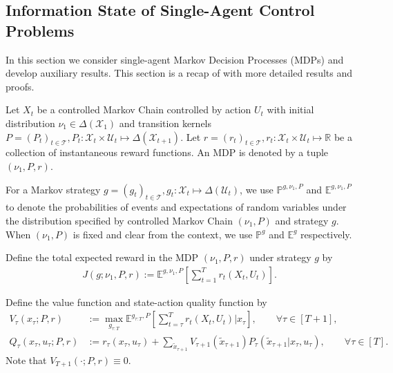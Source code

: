 \documentclass[pdflatex,sn-basic]{sn-jnl}
\newcommand{\E}{\mathbb{E}}
\renewcommand{\Pr}{\mathbb{P}}
\newcommand{\Qfunc}{Q}
\theoremstyle{thmstyleone}%
\theoremstyle{thmstyletwo}%
\theoremstyle{thmstylethree}%
\begin{document}
	
\appendix
\begin{appendices}

\section{Information State of Single-Agent Control Problems}\label{app:aux:infostate}
In this section we consider single-agent Markov Decision Processes (MDPs) and develop auxiliary results. This section is a recap of \cite{mahajan2016decentralized} with more detailed results and proofs. %

Let $X_t$ be a controlled Markov Chain controlled by action $U_t$ with initial distribution $\nu_1\in\Delta(\mathcal{X}_1)$ and transition kernels $P=(P_t)_{t\in\mathcal{T}}, P_t\colon\mathcal{X}_t\times \mathcal{U}_t\mapsto \Delta(\mathcal{X}_{t+1})$. Let $r=(r_t)_{t\in\mathcal{T}}, r_t\colon\mathcal{X}_t\times \mathcal{U}_t\mapsto \mathbb{R}$ be a collection of instantaneous reward functions. An MDP is denoted by a tuple $(\nu_1, P, r)$. 

For a Markov strategy $g=(g_t)_{t\in\mathcal{T}}, g_t\colon\mathcal{X}_t\mapsto \Delta(\mathcal{U}_t)$, we use $\Pr^{g, \nu_1, P}$ and $\E^{g, \nu_1, P}$ to denote the probabilities of events and expectations of random variables under the distribution specified by controlled Markov Chain $(\nu_1, P)$ and strategy $g$. When $(\nu_1, P)$ is fixed and clear from the context, we use $\Pr^{g}$ and $\E^{g}$ respectively.

Define the total expected reward in the MDP $(\nu_1, P, r)$ under strategy $g$ by
\begin{align}
	J(g; \nu_1, P, r) := \E^{g, \nu_1, P}\left[\sum_{t=1}^T r_t(X_t, U_t) \right].\label{eq:MDP:J}
\end{align}

Define the value function and state-action quality function by
\begin{align}
	V_\tau(x_\tau; P, r) &:= \max_{g_{\tau:T}}\E^{g_{\tau:T}, P}\left[\sum_{t=\tau}^T r_t(X_t, U_t)|x_\tau\right],\qquad\forall \tau\in [T+1],\\
	\Qfunc_\tau(x_\tau, u_\tau; P, r) &:= r_\tau(x_\tau, u_\tau) + \sum_{\tilde{x}_{\tau+1}} V_{\tau+1}(\tilde{x}_{\tau+1}) P_\tau(\tilde{x}_{\tau+1}|x_\tau, u_\tau),\qquad\forall \tau\in [T].
\end{align}
Note that $V_{T+1}(\cdot;P,r)\equiv 0$.


\end{appendices}
\end{document}
